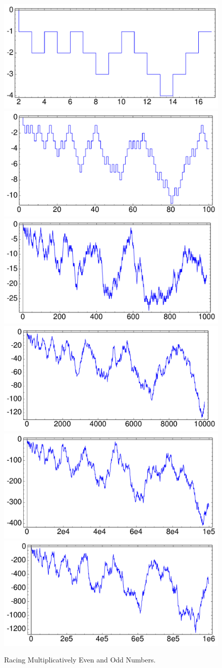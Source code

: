 \documentclass[openany]{book}
\theoremstyle{plain}
\theoremstyle{definition}
\begin{document}
 \begin{figure}[H]
\centering
\includegraphics[width=.45\textwidth]{illustrations/liouville-17}
\includegraphics[width=.45\textwidth]{illustrations/liouville-100}\\
\includegraphics[width=.45\textwidth]{illustrations/liouville-1000}
\includegraphics[width=.45\textwidth]{illustrations/liouville-10000}\\
\includegraphics[width=.45\textwidth]{illustrations/liouville-100000}
\includegraphics[width=.45\textwidth]{illustrations/liouville-1000000}\\
\caption{Racing Multiplicatively Even and Odd Numbers.\label{fig:liouville}}
\end{figure}
\end{document}
